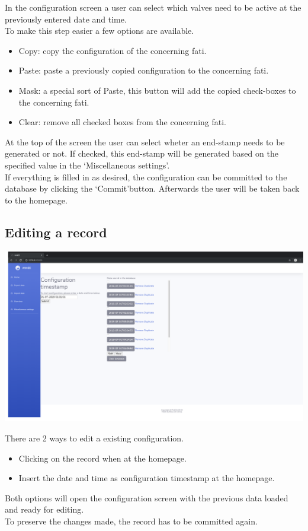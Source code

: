 \documentclass[12pt]{article}
\begin{document}
In the configuration screen a user can select which valves need to be active at the previously entered date and time.\\
To make this step easier a few options are available.
\begin{itemize}
	\item Copy: copy the configuration of the concerning fati.
	\item Paste: paste a previously copied configuration to the concerning fati.
	\item Mask: a special sort of Paste, this button will add the copied check-boxes to the concerning fati.
	\item Clear: remove all checked boxes from the concerning fati.
\end{itemize}
At the top of the screen the user can select wheter an end-stamp needs to be generated or not. If checked, this end-stamp will be generated based on the specified value in the \lq Miscellaneous settings\rq.\\
If everything is filled in as desired, the configuration can be committed to the database by clicking the \lq Commit\rq button. Afterwards the user will be taken back to the homepage.

\subsection{Editing a record}
\begin{center}
	\includegraphics[width=\linewidth]{images/Edit_options.png}
\end{center}
There are 2 ways to edit a existing configuration.
\begin{itemize}
	\item Clicking on the record when at the homepage.
	\item Insert the date and time as configuration timestamp at the homepage.
\end{itemize}
Both options will open the configuration screen with the previous data loaded and ready for editing.\\
To preserve the changes made, the record has to be committed again.
\end{document}
